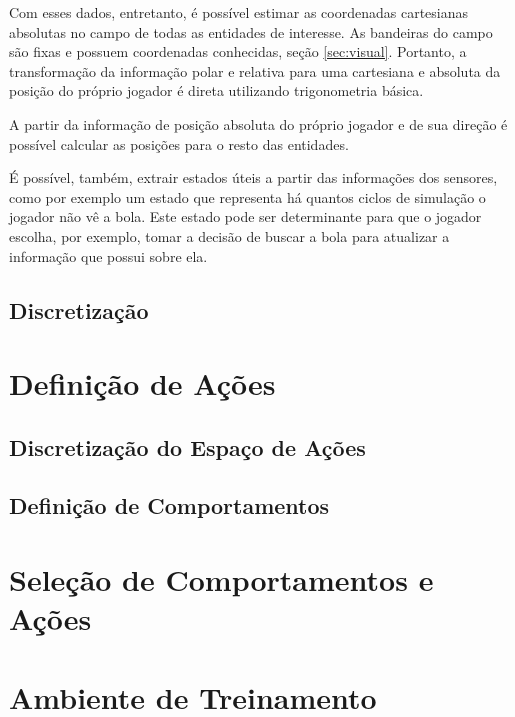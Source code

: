 \par Com esses dados, entretanto, é possível estimar as coordenadas cartesianas absolutas no campo de todas as entidades de interesse. As bandeiras do campo são fixas e possuem coordenadas conhecidas, seção \ref{sec:visual}. Portanto, a transformação da informação polar e relativa para uma cartesiana e absoluta da posição do próprio jogador é direta utilizando trigonometria básica. 

\par A partir da informação de posição absoluta do próprio jogador e de sua direção é possível calcular as posições para o resto das entidades.

\par É possível, também, extrair estados úteis a partir das informações dos sensores, como por exemplo um estado que representa há quantos ciclos de simulação o jogador não vê a bola. Este estado pode ser determinante para que o jogador escolha, por exemplo, tomar a decisão de buscar a bola para atualizar a informação que possui sobre ela.

\subsection{Discretização}

\section{Definição de Ações}

\subsection{Discretização do Espaço de Ações}

\subsection{Definição de Comportamentos}

\section{Seleção de Comportamentos e Ações}

\section{Ambiente de Treinamento}


